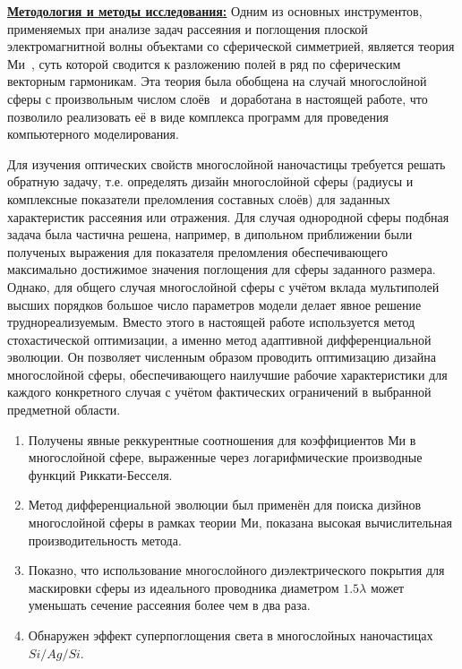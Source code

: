 \underline{\textbf{Методология и методы исследования:}} Одним из
основных инструментов, применяемых при анализе задач рассеяния и
поглощения плоской электромагнитной волны объектами со сферической
симметрией, является теория Ми~\cite{Mie-1908}, суть которой
сводится к разложению полей в ряд по сферическим векторным
гармоникам. Эта теория была обобщена на случай многослойной сферы с
произвольным числом слоёв~\cite{Yang-2003, Pena-scattnlay-2009} и
доработана в настоящей работе, что позволило реализовать её в виде
комплекса программ для проведения компьютерного моделирования.

Для изучения оптических свойств многослойной наночастицы требуется
решать обратную задачу, т.е. определять дизайн многослойной сферы
(радиусы и комплексные показатели преломления составных слоёв) для
заданных характеристик рассеяния или отражения. Для случая однородной
сферы подбная задача была частична решена, например, в дипольном
приближении были полученых выражения для показателя преломления
обеспечивающего максимально достижимое значения поглощения для сферы
заданного размера\cite{Grigoriev-2015}. Однако, для
общего случая многослойной сферы с учётом вклада мультиполей высших
порядков большое число параметров модели делает явное решение
труднореализуемым. Вместо этого в настоящей работе используется
метод стохастической оптимизации, а именно метод адаптивной
дифференциальной эволюции. Он позволяет численным образом проводить
оптимизацию дизайна многослойной сферы, обеспечивающего наилучшие
рабочие характеристики для каждого конкретного случая с учётом
фактических ограничений в выбранной предметной области.

\novelty   
\begin{enumerate}
  \item Получены явные реккурентные соотношения для
    коэффициентов Ми в многослойной сфере, выраженные через
    логарифмические производные функций Риккати-Бесселя. 
  \item Метод дифференциальной эволюции был применён для
    поиска дизйнов многослойной сферы в рамках теории Ми,
    показана высокая вычислительная производительность метода.
  \item Показно, что использование многослойного диэлектрического
    покрытия для маскировки сферы из идеального проводника диаметром
    $1.5\lambda$ может уменьшать сечение рассеяния более чем в два
    раза.
  \item Обнаружен эффект суперпоглощения света в многослойных
    наночастицах $Si/Ag/Si$.
\end{enumerate}




